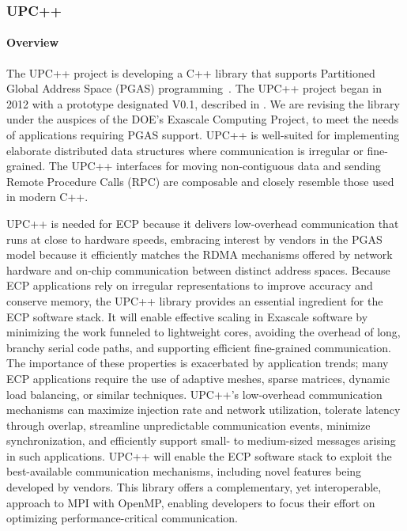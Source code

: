 \subsubsection{UPC++} 
\paragraph{Overview} 
The UPC++ project is developing a C++ library
that supports Partitioned Global Address Space (PGAS) programming~\cite{Bachan:paw17}.
The UPC++ project began in 2012 with a prototype designated V0.1, described in \cite{zheng:ipdps14}.
We are revising the library under the auspices of the DOE's Exascale Computing
Project, to meet the needs of applications requiring PGAS support.
UPC++ is well-suited for implementing elaborate distributed data structures where
communication is irregular or fine-grained. The UPC++ interfaces for
moving non-contiguous data and sending Remote Procedure Calls (RPC)
are composable and closely resemble those used in modern C++.

UPC++ is needed for ECP because it delivers low-overhead communication that runs
at close to hardware speeds, embracing 
interest by vendors in the PGAS model because it 
efficiently matches the RDMA mechanisms offered by
network hardware and on-chip communication between distinct address
spaces.  
Because ECP applications rely on irregular representations
to improve accuracy and conserve memory, the UPC++ library provides
an essential ingredient for the ECP software stack.  It will enable
effective scaling in Exascale software by minimizing the work funneled
to lightweight cores, avoiding the overhead of long, branchy serial
code paths, and supporting efficient fine-grained communication.  The
importance of these properties is exacerbated by application trends;
many ECP applications require the use of adaptive meshes, sparse
matrices, dynamic load balancing, or similar techniques.  UPC++'s
low-overhead communication mechanisms can maximize injection rate and
network utilization, tolerate latency through overlap, streamline
unpredictable communication events, minimize synchronization, and
efficiently support small- to medium-sized messages arising in such
applications.  UPC++ will enable the ECP software stack to exploit
the best-available communication mechanisms, including novel features
being developed by vendors.  This library offers a complementary,
yet interoperable, approach to MPI with OpenMP, enabling developers to
focus their effort on optimizing performance-critical communication.

